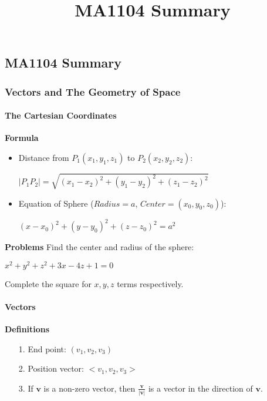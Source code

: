 \documentclass[10pt, twocolumn]{article}
\title{MA1104 Summary}
\begin{document}
\begin{center}
\part*{MA1104 Summary}
\end{center}
\tableofcontents
\newpage

\setcounter{section}{11}
\onehalfspacing
\section{Vectors and The Geometry of Space}
\subsection{The Cartesian Coordinates}
{\bf Formula}
\begin{itemize}
\item Distance from $P_1(x_1,y_1,z_1)$ to $P_2(x_2,y_2,z_2)$:
\begin{center}
$|P_1P_2| = \sqrt{(x_1-x_2)^2+(y_1-y_2)^2+(z_1-z_2)^2}$
\end{center}
\item Equation of Sphere ($Radius = a$, $Center = (x_0,y_0,z_0)$):
\begin{center}
$(x-x_0)^2+(y-y_0)^2+(z-z_0)^2 = a^2$
\end{center}
\end{itemize}
{\bf Problems}
\newline
Find the center and radius of the sphere:
\begin{center}
$x^2+y^2+z^2+3x-4z+1=0$
\end{center}
Complete the square for $x,y,z$ terms respectively.

\subsection{Vectors}
{\bf Definitions}
\begin{enumerate}
\item[1.]{End point: $(v_1,v_2,v_3)$}
\item[2.]{Position vector: $<v_1,v_2,v_3>$}
\item[3.]{If $\mathbf{v}$ is a non-zero vector, then $\frac{\mathbf{v}}{|\mathbf{v}|}$ is a vector in the direction of $\mathbf{v}$.}
\end{enumerate}
\end{document}
